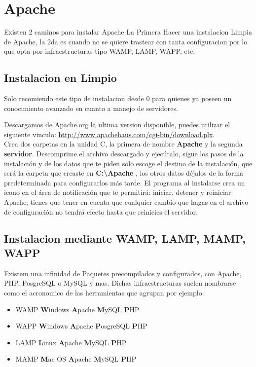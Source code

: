 \section{Apache}

Existen 2 caminos para instalar Apache La Primera Hacer una instalacion Limpia
de Apache, la 2da es cuando no se quiere trastear con tanta configuracion por lo que
opta por infraestructuras tipo WAMP, LAMP, WAPP, etc.

\subsection{Instalacion en Limpio}

Solo recomiendo este tipo de instalacion desde 0 para quienes ya poseen un conocimiento
avanzado en cuanto a manejo de servidores.

Descargamos de \url{Apache.org} la ultima version disponible, puedes utilizar el siguiente
vinculo: \url{http://www.apachehaus.com/cgi-bin/download.plx}. \\ 

Crea dos carpetas en la unidad C, la primera de nombre {\bfseries Apache} y la segunda
{\bfseries servidor}. Descomprime el archivo descargado y ejec\'utalo,
sigue los pasos de la instalaci\'on y de los datos que te piden solo escoge el
destino de la instalaci\'on, que ser\'a la carpeta que creaste en
{\bfseries C:\textbackslash Apache }, los otros datos d\'ejalos de la forma
predeterminada para configurarlos m\'as tarde.
El programa al instalarse crea un icono en el área de notificación que te
permitir\'a: iniciar, detener y reiniciar Apache; tienes que tener en cuenta que
cualquier cambio que hagas en el archivo de configuración no tendrá efecto
hasta que reinicies el servidor.

\subsection{Instalacion mediante WAMP, LAMP, MAMP, WAPP}

Existem una infinidad de Paquetes precompilados y configurados, con Apache, PHP, PosgreSQL o MySQL y mas.
Dichas infraestructuras suelen nombrarse como el acronomico de las herramientas que agrupan por ejemplo:\\[1cm]

\begin{itemize}
    \item {\large WAMP {\bfseries W}indows {\bfseries A}pache {\bfseries M}ySQL {\bfseries P}HP}
    \item {\large WAPP  {\bfseries W}indows {\bfseries A}pache {\bfseries P}osgreSQL {\bfseries P}HP}  
    \item {\large LAMP {\bfseries L}inux {\bfseries A}pache {\bfseries M}ySQL {\bfseries P}HP} 
    \item {\large MAMP {\bfseries M}ac OS {\bfseries A}pache {\bfseries M}ySQL {\bfseries P}HP}  
\end{itemize}



